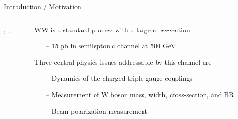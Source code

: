 \documentclass[10pt]{beamer}
\begin{document}
\begin{frame}{Introduction / Motivation}

\begin{columns}
\begin{column}{0.5\textwidth}
;
    ;
\end{column}
\begin{column}{0.5\textwidth}
	WW is a standard process with a large cross-section 
		\begin{itemize}
		\scriptsize
		\item[--] 15 pb in semileptonic channel at 500 GeV
		\end{itemize} 
	Three central physics issues addressable by this channel are
		\begin{itemize}
		\scriptsize
		\item[--] Dynamics of the charged triple gauge couplings
		\item[--] Measurement of W boson mass, width, cross-section, and BR
		\item[--] Beam polarization measurement
		
		\end{itemize}
\end{column}
\end{columns}

\end{frame}
\end{document}
